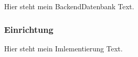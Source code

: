 Hier steht mein BackendDatenbank Text.

\subsubsection{Einrichtung}
Hier steht mein Imlementierung Text.